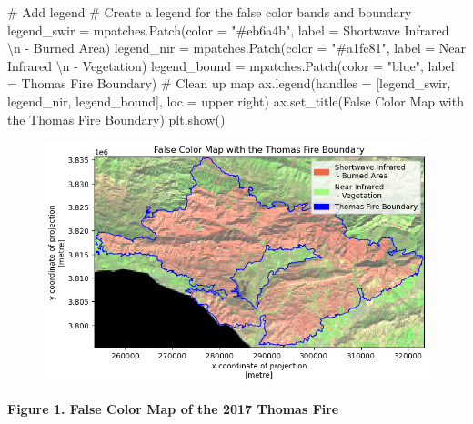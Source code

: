 \documentclass[
  letterpaper,
  DIV=11,
  numbers=noendperiod]{scrartcl}
\newenvironment{Shaded}{\begin{snugshade}}{\end{snugshade}}
\newcommand{\CharTok}[1]{\textcolor[rgb]{0.13,0.47,0.30}{#1}}
\newcommand{\CommentTok}[1]{\textcolor[rgb]{0.37,0.37,0.37}{#1}}
\newcommand{\NormalTok}[1]{\textcolor[rgb]{0.00,0.23,0.31}{#1}}
\newcommand{\OperatorTok}[1]{\textcolor[rgb]{0.37,0.37,0.37}{#1}}
\newcommand{\StringTok}[1]{\textcolor[rgb]{0.13,0.47,0.30}{#1}}
\begin{document}
\begin{Shaded}
\begin{Highlighting}[]
\CommentTok{\# Add legend}
\CommentTok{\# Create a legend for the false color bands and boundary}
\NormalTok{legend\_swir }\OperatorTok{=}\NormalTok{ mpatches.Patch(color }\OperatorTok{=} \StringTok{"\#eb6a4b"}\NormalTok{, label }\OperatorTok{=} \StringTok{\textquotesingle{}Shortwave Infrared }\CharTok{\textbackslash{}n}\StringTok{ {-} Burned Area\textquotesingle{}}\NormalTok{)}
\NormalTok{legend\_nir }\OperatorTok{=}\NormalTok{ mpatches.Patch(color }\OperatorTok{=} \StringTok{"\#a1fc81"}\NormalTok{, label }\OperatorTok{=} \StringTok{\textquotesingle{}Near Infrared }\CharTok{\textbackslash{}n}\StringTok{ {-} Vegetation\textquotesingle{}}\NormalTok{)}
\NormalTok{legend\_bound }\OperatorTok{=}\NormalTok{ mpatches.Patch(color }\OperatorTok{=} \StringTok{"blue"}\NormalTok{, label }\OperatorTok{=} \StringTok{\textquotesingle{}Thomas Fire Boundary\textquotesingle{}}\NormalTok{)}
\CommentTok{\# Clean up map}
\NormalTok{ax.legend(handles }\OperatorTok{=}\NormalTok{ [legend\_swir, legend\_nir, legend\_bound], loc }\OperatorTok{=} \StringTok{\textquotesingle{}upper right\textquotesingle{}}\NormalTok{)}
\NormalTok{ax.set\_title(}\StringTok{\textquotesingle{}False Color Map with the Thomas Fire Boundary\textquotesingle{}}\NormalTok{)}
\NormalTok{plt.show()}
\end{Highlighting}
\end{Shaded}

\begin{figure}[H]

{\centering \includegraphics{spatial_analysis_thomas_fire_files/figure-pdf/cell-8-output-1.png}

}

\end{figure}

\textbf{Figure 1. False Color Map of the 2017 Thomas Fire}
\end{document}
